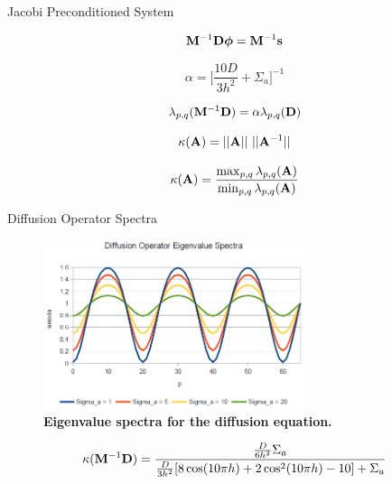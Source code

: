 \documentclass{beamer}
\begin{document}
\begin{frame}{Jacobi Preconditioned System}

\begin{equation}
  \mathbf{M}^{-1} \mathbf{D} \boldsymbol{\phi} = \mathbf{M}^{-1} \mathbf{s}
  \label{eq:precond_diffsion}
\end{equation}

\begin{equation}
  \alpha = \Bigg[\frac{10 D}{3 h^2} + \Sigma_a\Bigg]^{-1}
  \label{eq:jacobi_scaling}
\end{equation}

\begin{equation}
  \lambda_{p,q}(\mathbf{M}^{-1} \mathbf{D}) = \alpha \lambda_{p,q}(\mathbf{D})
  \label{eq:preconditioned_Eigenvalues}
\end{equation}

\begin{equation}
  \kappa(\ve{A}) = ||\ve{A}||\ ||\ve{A}^{-1}||
  \label{eq:condition_number}
\end{equation}

\begin{equation}
  \kappa(\mathbf{A}) =
  \frac{\max_{p,q}\lambda_{p,q}(\mathbf{A})}{\min_{p,q}\lambda_{p,q}(\mathbf{A})}
  \label{eq:condition_number_2}
\end{equation}

\end{frame}

\begin{frame}{Diffusion Operator Spectra}

\begin{figure}[t!]
  \begin{center}
    \includegraphics[width=3in,clip]{diffusion_spectrum.png}
  \end{center}
  \caption{\textbf{Eigenvalue spectra for the diffusion equation.}}
  \label{fig:diffusion_spectrum}
\end{figure}

\begin{equation}
  \kappa(\mathbf{M}^{-1} \mathbf{D}) =
  \frac{\frac{D}{6h^2}\Sigma_a}{\frac{D}{3h^2}[8 \cos(10 \pi h) + 2
      \cos^2(10 \pi h) - 10] + \Sigma_a}
  \label{eq:diffusion_condition}
\end{equation}

\end{frame}
\end{document}
